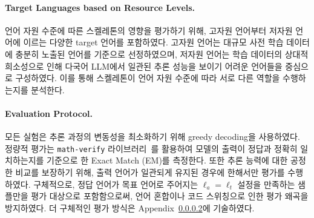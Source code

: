 \paragraph{Target Languages based on Resource Levels.}
언어 자원 수준에 따른 스켈레톤의 영향을 평가하기 위해, 고자원 언어부터 저자원 언어에 이르는 다양한 target 언어를 포함하였다. 고자원 언어는 대규모 사전 학습 데이터에 충분히 노출된 언어를 기준으로 선정하였으며, 저자원 언어는 학습 데이터의 상대적 희소성으로 인해 다국어 LLM에서 일관된 추론 성능을 보이기 어려운 언어들을 중심으로 구성하였다. 이를 통해 스켈레톤이 언어 자원 수준에 따라 서로 다른 역할을 수행하는지를 분석한다.

\paragraph{Evaluation Protocol.}
모든 실험은 추론 과정의 변동성을 최소화하기 위해 greedy decoding을 사용하였다. 정량적 평가는 \texttt{math-verify} 라이브러리~\citep{mathverify}를 활용하여 모델의 출력이 정답과 정확히 일치하는지를 기준으로 한 Exact Match (EM)를 측정한다. 또한 추론 능력에 대한 공정한 비교를 보장하기 위해, 출력 언어가 일관되게 유지된 경우에 한해서만 평가를 수행하였다. 구체적으로, 정답 언어가 목표 언어로 주어지는 $\ell_a=\ell_t$ 설정을 만족하는 샘플만을 평가 대상으로 포함함으로써, 언어 혼합이나 코드 스위칭으로 인한 평가 왜곡을 방지하였다. 더 구체적인 평가 방식은 Appendix~\ref{}에 기술하였다.




